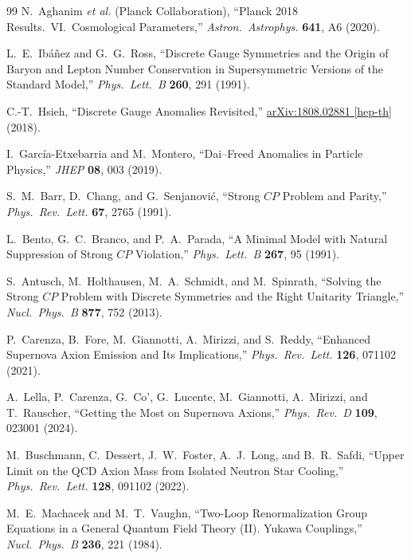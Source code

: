 \documentclass[11pt,a4paper]{article}
\begin{document}
\begin{thebibliography}{99}
N.~Aghanim \textit{et al.} (Planck Collaboration), ``Planck 2018 Results.\ VI.\ Cosmological Parameters,'' \emph{Astron.\ Astrophys.} \textbf{641}, A6 (2020).

L.~E.~Ib\'a\~nez and G.~G.~Ross, ``Discrete Gauge Symmetries and the Origin of Baryon and Lepton Number Conservation in Supersymmetric Versions of the Standard Model,'' \emph{Phys.\ Lett.\ B} \textbf{260}, 291 (1991).

C.-T.~Hsieh, ``Discrete Gauge Anomalies Revisited,'' \href{https://arxiv.org/abs/1808.02881}{arXiv:1808.02881 [hep-th]} (2018).

I.~Garc\'ia-Etxebarria and M.~Montero, ``Dai--Freed Anomalies in Particle Physics,'' \emph{JHEP} \textbf{08}, 003 (2019).

S.~M.~Barr, D.~Chang, and G.~Senjanovi\'c, ``Strong $CP$ Problem and Parity,'' \emph{Phys.\ Rev.\ Lett.} \textbf{67}, 2765 (1991).

L.~Bento, G.~C.~Branco, and P.~A.~Parada, ``A Minimal Model with Natural Suppression of Strong $CP$ Violation,'' \emph{Phys.\ Lett.\ B} \textbf{267}, 95 (1991).

S.~Antusch, M.~Holthausen, M.~A.~Schmidt, and M.~Spinrath, ``Solving the Strong $CP$ Problem with Discrete Symmetries and the Right Unitarity Triangle,'' \emph{Nucl.\ Phys.\ B} \textbf{877}, 752 (2013).

P.~Carenza, B.~Fore, M.~Giannotti, A.~Mirizzi, and S.~Reddy, ``Enhanced Supernova Axion Emission and Its Implications,'' \emph{Phys.\ Rev.\ Lett.} \textbf{126}, 071102 (2021).

A.~Lella, P.~Carenza, G.~Co', G.~Lucente, M.~Giannotti, A.~Mirizzi, and T.~Rauscher, ``Getting the Most on Supernova Axions,'' \emph{Phys.\ Rev.\ D} \textbf{109}, 023001 (2024).

M.~Buschmann, C.~Dessert, J.~W.~Foster, A.~J.~Long, and B.~R.~Safdi, ``Upper Limit on the QCD Axion Mass from Isolated Neutron Star Cooling,'' \emph{Phys.\ Rev.\ Lett.} \textbf{128}, 091102 (2022).

M.~E.~Machacek and M.~T.~Vaughn, ``Two-Loop Renormalization Group Equations in a General Quantum Field Theory (II). Yukawa Couplings,'' \emph{Nucl.\ Phys.\ B} \textbf{236}, 221 (1984).


\end{thebibliography}
\end{document}
